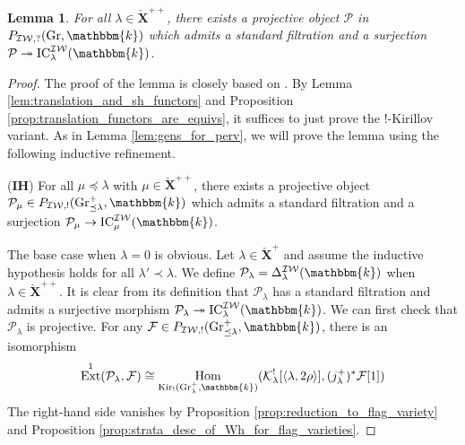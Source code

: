 \documentclass{amsart}
\renewcommand{\k}{\mathbbm{k}}
\newcommand{\scrF}{\mathcal{F}}
\newcommand{\scrK}{\mathcal{K}}
\newcommand{\scrP}{\mathcal{P}}
\newcommand{\bfXv}{\check{\mathbf{X}}}
\newcommand{\IW}{\mathcal{IW}}
\DeclareMathOperator{\Hom}{Hom}
\DeclareMathOperator{\Ext}{Ext}
\DeclareMathOperator{\IC}{IC}
\DeclareMathOperator{\Gr}{Gr}
\DeclareMathOperator{\Kir}{Kir}
\newtheorem{lemma}[subsubsection]{Lemma}
\theoremstyle{definition}
\begin{document}
    \begin{lemma}\label{lem:existence_of_projs_for_IC}
        For all $\lambda \in \bfXv^{++}$, there exists a projective object $\scrP$ in $P_{\IW, ?} (\Gr, \k)$ which admits a standard filtration and a surjection $\scrP \twoheadrightarrow \IC_{\lambda}^{\IW} (\k)$.
    \end{lemma}
    \begin{proof}
       The proof of the lemma is closely based on \cite[Proposition 2.3.1]{RSW}. By Lemma \ref{lem:translation_and_sh_functors} and Proposition \ref{prop:translation_functors_are_equivs}, it suffices to just prove the $!$-Kirillov variant. 
       As in Lemma \ref{lem:gens_for_perv}, we will prove the lemma using the following inductive refinement.

        (\textbf{IH}) For all $\mu \preceq \lambda$ with $\mu \in \bfXv^{++}$, there exists a projective object $\scrP_{\mu} \in P_{\IW, !} (\Gr_{\preceq \lambda}^+, \k)$ which admits a standard filtration and a surjection $\scrP_{\mu} \to \IC_{\mu}^{\IW} (\k)$.

        The base case when $\lambda = 0$ is obvious. Let $\lambda \in \bfXv^+$ and assume the inductive hypothesis holds for all $\lambda' \prec \lambda$.
        We define $\scrP_{\lambda} = \Delta_{\lambda}^{\IW} (\k)$ when $\lambda \in \bfXv^{++}$. 
        It is clear from its definition that $\scrP_{\lambda}$ has a standard filtration and admits a surjective morphism $\scrP_{\lambda} \twoheadrightarrow \IC_{\lambda}^{\IW} (\k)$.
        We can first check that $\scrP_{\lambda}$ is projective. For any $\scrF \in P_{\IW, !} (\Gr_{\preceq \lambda}^+, \k)$, there is an isomorphism
        \[\Ext^1 (\scrP_{\lambda}, \scrF) \cong \Hom_{\Kir_! (\Gr_{\lambda}^+, \k)} (\scrK_{\lambda}^! [\langle \lambda, 2\rho \rangle ], (j_{\lambda}^+)^* \scrF [1])\]
        The right-hand side vanishes by Proposition \ref{prop:reduction_to_flag_variety} and Proposition \ref{prop:strata_desc_of_Wh_for_flag_varieties}.


\end{proof}
\end{document}
